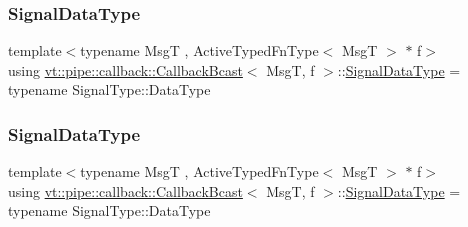 \subsubsection{\texorpdfstring{Signal\+Data\+Type}{SignalDataType}\hspace{0.1cm}{\footnotesize\ttfamily [1/2]}}
{\footnotesize\ttfamily template$<$typename MsgT , Active\+Typed\+Fn\+Type$<$ Msg\+T $>$ $\ast$ f$>$ \\
using \hyperlink{structvt_1_1pipe_1_1callback_1_1_callback_bcast}{vt\+::pipe\+::callback\+::\+Callback\+Bcast}$<$ MsgT, f $>$\+::\hyperlink{structvt_1_1pipe_1_1callback_1_1_callback_bcast_aaf994b71056001334d30d74fa9c958f9}{Signal\+Data\+Type} =  typename Signal\+Type\+::\+Data\+Type}

\mbox{\label{structvt_1_1pipe_1_1callback_1_1_callback_bcast_aaf994b71056001334d30d74fa9c958f9}} 
\subsubsection{\texorpdfstring{Signal\+Data\+Type}{SignalDataType}\hspace{0.1cm}{\footnotesize\ttfamily [2/2]}}
{\footnotesize\ttfamily template$<$typename MsgT , Active\+Typed\+Fn\+Type$<$ Msg\+T $>$ $\ast$ f$>$ \\
using \hyperlink{structvt_1_1pipe_1_1callback_1_1_callback_bcast}{vt\+::pipe\+::callback\+::\+Callback\+Bcast}$<$ MsgT, f $>$\+::\hyperlink{structvt_1_1pipe_1_1callback_1_1_callback_bcast_aaf994b71056001334d30d74fa9c958f9}{Signal\+Data\+Type} =  typename Signal\+Type\+::\+Data\+Type}

\mbox{\label{structvt_1_1pipe_1_1callback_1_1_callback_bcast_a114e04d430944cfbc25e3f117a50d03e}} 
